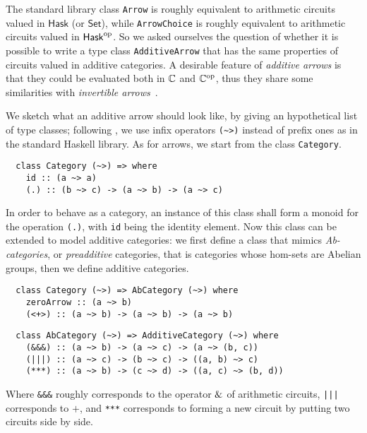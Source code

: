 The standard library class \lstinline+Arrow+ is roughly equivalent to
arithmetic circuits valued in $\mathsf{Hask}$ (or $\mathsf{Set}$),
while \lstinline+ArrowChoice+ is roughly equivalent to arithmetic
circuits valued in $\mathsf{Hask}^{\mathrm{op}}$. So we asked ourselves the
question of whether it is possible to write a type class
\lstinline+AdditiveArrow+ that has the same properties of circuits
valued in additive categories. A desirable feature of \emph{additive
  arrows} is that they could be evaluated both in $\mathbb{C}$ and $\mathbb{C}^{\mathrm{op}}$,
thus they share some similarities with \emph{invertible
  arrows}~\cite{alimarine+al:invertible-arrows}.

We sketch what an additive arrow should look like, by giving an
hypothetical list of type classes; following
\cite{yorgey:typeclassopedia}, we use infix operators \lstinline+(~>)+
instead of prefix ones as in the standard Haskell library.  As for
arrows, we start from the class \lstinline+Category+.

\begin{lstlisting}
  class Category (~>) => where
    id :: (a ~> a)
    (.) :: (b ~> c) -> (a ~> b) -> (a ~> c)
\end{lstlisting}

In order to behave as a category, an instance of this class shall form
a monoid for the operation \lstinline+(.)+, with \lstinline+id+ being
the identity element. Now this class can be extended to model additive
categories: we first define a class that mimics \emph{Ab-categories},
or \emph{preadditive} categories, that is categories whose hom-sets
are Abelian groups, then we define additive categories.

\begin{lstlisting}
  class Category (~>) => AbCategory (~>) where
    zeroArrow :: (a ~> b)
    (<+>) :: (a ~> b) -> (a ~> b) -> (a ~> b)
\end{lstlisting}

\begin{lstlisting}
  class AbCategory (~>) => AdditiveCategory (~>) where
    (&&&) :: (a ~> b) -> (a ~> c) -> (a ~> (b, c))
    (|||) :: (a ~> c) -> (b ~> c) -> ((a, b) ~> c)
    (***) :: (a ~> b) -> (c ~> d) -> ((a, c) ~> (b, d))
\end{lstlisting}

Where \lstinline+&&&+ roughly corresponds to the operator $\operatorname{\&}$ of
arithmetic circuits, \lstinline+|||+ corresponds to $+$, and
\lstinline+***+ corresponds to forming a new circuit by putting two
circuits side by side.

